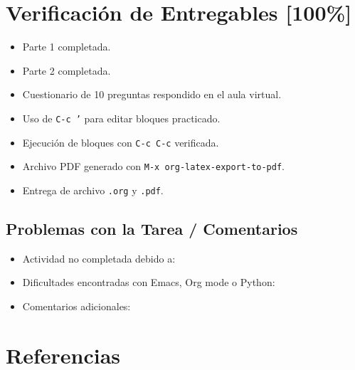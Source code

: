\documentclass{article}
\begin{document}
\section{Verificación de Entregables [100\%]}
\label{sec:org50fb8c2}
\begin{itemize}
\item[{$\boxtimes$}] Parte 1 completada.
\item[{$\boxtimes$}] Parte 2 completada.
\item[{$\boxtimes$}] Cuestionario de 10 preguntas respondido en el aula virtual.
\item[{$\boxtimes$}] Uso de \texttt{C-c '} para editar bloques practicado.
\item[{$\boxtimes$}] Ejecución de bloques con \texttt{C-c C-c} verificada.
\item[{$\boxtimes$}] Archivo PDF generado con \texttt{M-x org-latex-export-to-pdf}.
\item[{$\boxtimes$}] Entrega de archivo \texttt{.org} y \texttt{.pdf}.
\end{itemize}

\subsection{Problemas con la Tarea / Comentarios}
\label{sec:org7018b06}
\begin{itemize}
\item Actividad no completada debido a:
\item Dificultades encontradas con Emacs, Org mode o Python:
\item Comentarios adicionales:
\end{itemize}
\section{Referencias}
\label{sec:orgef4e027}
\printbibliography
\end{document}
